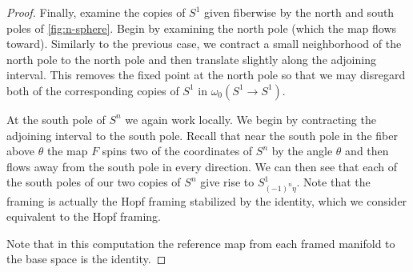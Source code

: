 \documentclass[11pt]{amsart}
\theoremstyle{plain}   %
\theoremstyle{definition}
\theoremstyle{remark}
\numberwithin{equation}{section}
\begin{document}
\begin{proof}
Finally, examine the copies of $S^1$ given fiberwise by the north and south poles of \cref{fig:n-sphere}. Begin by examining the north pole (which the map flows toward). Similarly to the previous case, we contract a small neighborhood of the north pole to the north pole and then translate slightly along the adjoining interval. This removes the fixed point at the north pole so that we may disregard both of the corresponding copies of $S^1$ in $\omega_0(S^1\to S^1)$. 

At the south pole of $S^n$ we again work locally. We begin by contracting the adjoining interval to the south pole. Recall that near the south pole in the fiber above $\theta$ the map $F$ spins two of the coordinates of $S^n$ by the angle $\theta$ and then flows away from the south pole in every direction. We can then see that each of the south poles of our two copies of $S^n$ give rise to $S^1_{(-1)^n\eta}$. Note that the framing is actually the Hopf framing stabilized by the identity, which we consider equivalent to the Hopf framing.

Note that in this computation the reference map from each framed manifold to the base space is the identity.
\end{proof}
\end{document}
